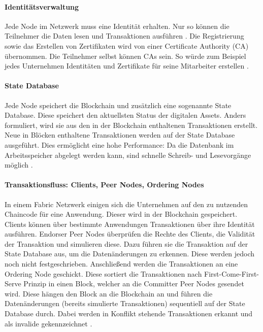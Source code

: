\paragraph{Identitätsverwaltung}
Jede Node im Netzwerk muss eine Identität erhalten. Nur so können die Teilnehmer die Daten lesen und Transaktionen ausführen \cite{SchererPerformanceScalabilityBlockchain2017}. Die Registrierung sowie das Erstellen von Zertifikaten wird von einer Certificate Authority (CA) übernommen. Die Teilnehmer selbst können CAs sein. So würde zum Beispiel jedes Unternehmen Identitäten und Zertifikate für seine Mitarbeiter erstellen \cite{HyperledgerFabricTeamCAHyperledgerFabric}.

\paragraph{State Database}
Jede Node speichert die Blockchain und zusätzlich eine sogenannte State Database. Diese speichert den aktuellsten Status der digitalen Assets. Anders formuliert, wird sie aus den in der Blockchain enthaltenen Transaktionen erstellt. Neue in Blöcken enthaltene Transaktionen werden auf der State Database ausgeführt. Dies ermöglicht eine hohe Performance: Da die Datenbank im Arbeitsspeicher abgelegt werden kann, sind schnelle Schreib- und Lesevorgänge möglich \cite{SchererPerformanceScalabilityBlockchain2017}.

\paragraph{Transaktionsfluss: Clients, Peer Nodes, Ordering Nodes}
In einem Fabric Netzwerk einigen sich die Unternehmen auf den zu nutzenden Chaincode für eine Anwendung. Dieser wird in der Blockchain gespeichert. Clients können über bestimmte Anwendungen Transaktionen über ihre Identität ausführen. Endorser Peer Nodes überprüfen die Rechte des Clients, die Validität der Transaktion und simulieren diese. Dazu führen sie die Transaktion auf der State Database aus, um die Datenänderungen zu erkennen. Diese werden jedoch noch nicht festgeschrieben. Anschließend werden die Transaktionen an eine Ordering Node geschickt. Diese sortiert die Transaktionen nach First-Come-First-Serve Prinzip in einen Block, welcher an die Committer Peer Nodes gesendet wird. Diese hängen den Block an die Blockchain an und führen die Datenänderungen (bereits simulierte Transaktionen) sequentiell auf der State Database durch. Dabei werden in Konflikt stehende Transaktionen erkannt und als invalide gekennzeichnet \cite{SchererPerformanceScalabilityBlockchain2017}.

